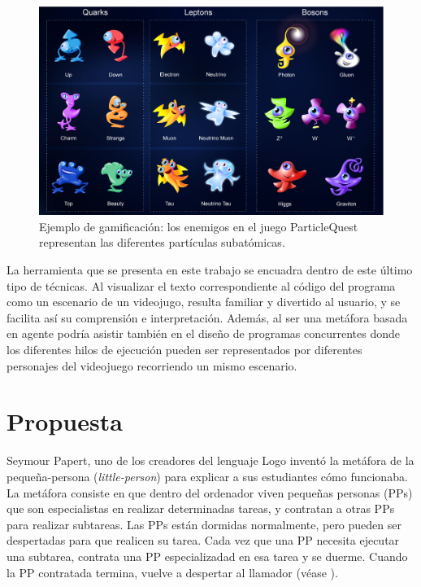 \documentclass{llncs}
\begin{document}
\begin{figure}[ht]
\begin{center}
\includegraphics[scale=0.3]{images/particlequest.eps}
\caption{Ejemplo de gamificación: los enemigos en el juego ParticleQuest representan las diferentes partículas subatómicas.
\label{fig:particlequest}}
\end{center}
\end{figure}

La herramienta que se presenta en este trabajo se encuadra dentro de este último tipo de técnicas. Al visualizar el texto correspondiente al código del programa como un escenario de un videojugo, resulta familiar y divertido al usuario, y se facilita así su comprensión e interpretación. Además, al ser una metáfora basada en agente \cite{travers1996programming} podría asistir también en el diseño de programas concurrentes donde los diferentes hilos de ejecución pueden ser representados por diferentes personajes del videojuego recorriendo un mismo escenario.





\section{Propuesta}
\label{sec:proposal}

Seymour Papert, uno de los creadores del lenguaje Logo inventó la
metáfora de la pequeña-persona ({\em little-person}) para explicar a
sus estudiantes cómo funcionaba. La metáfora consiste en que dentro del ordenador viven pequeñas personas (PPs) que son especialistas en
realizar determinadas tareas, y contratan a otras PPs para realizar
subtareas. Las PPs están dormidas normalmente, pero pueden ser
despertadas para que realicen su tarea. Cada vez que una PP necesita
ejecutar una subtarea, contrata una PP especializadad en esa tarea y
se duerme. Cuando la PP contratada termina, vuelve a despertar al
llamador (véase \cite{harvey1985computer}).
\end{document}
